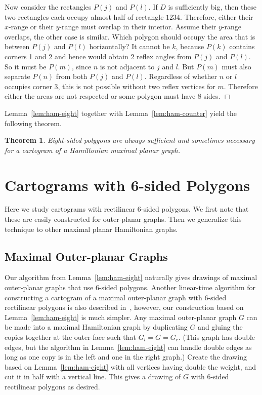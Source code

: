 \documentclass[11pt]{article}
\newtheorem{theorem}{Theorem}[section]
\newenvironment{proof}{{\bf Proof:} }{\hspace*{\fill}$\Box$\vspace{2mm}}
\begin{document}
\begin{proof}
Now consider the rectangles $P(j)$ and $P(l)$.  If $D$ is sufficiently big,
then these two rectangles each occupy almost half of rectangle $1234$.
Therefore, either their $x$-range or their $y$-range must overlap in their
interior.
Assume their $y$-range overlaps, the other case is similar.  Which polygon
should occupy the area that is between $P(j)$ and $P(l)$ horizontally?
It cannot be $k$, because $P(k)$ contains corners 1 and 2 and hence would
obtain 2 reflex angles from $P(j)$ and $P(l)$.  So it must be $P(m)$, since
$n$ is not adjacent to $j$ and $l$.
But $P(m)$ must
also separate $P(n)$ from both $P(j)$ and $P(l)$.  Regardless of whether
$n$ or $l$ occupies corner 3, this is not possible without two reflex
vertices for $m$.
Therefore either the areas are not respected or some polygon must have
8 sides.
\end{proof}

Lemma~\ref{lem:ham-eight} together with Lemma~\ref{lem:ham-counter} yield the
following theorem.

\begin{theorem}
 Eight-sided polygons are always sufficient and sometimes necessary for a cartogram of a Hamiltonian maximal planar graph.
\end{theorem}















\section{Cartograms with 6-sided Polygons}
\label{sec:six-side}


Here we study cartograms with
rectilinear 6-sided polygons. We first note that these are
easily constructed for outer-planar graphs.  Then we generalize this
technique to other maximal planar Hamiltonian graphs.

\subsection{Maximal Outer-planar Graphs}

Our algorithm from Lemma~\ref{lem:ham-eight} naturally gives drawings
of maximal outer-planar graphs that use 6-sided polygons.
Another linear-time algorithm for constructing a cartogram of a maximal
outer-planar graph with 6-sided rectilinear polygons is also described
in~\cite{ABFGKK11}, however, our construction
based on Lemma~\ref{lem:ham-eight} is much simpler.
Any
maximal outer-planar graph $G$ can be made into a maximal Hamiltonian
graph by duplicating $G$ and gluing the copies together at the outer-face
such that $G_l=G=G_r$.  (This graph has double edges, but the algorithm
in Lemma~\ref{lem:ham-eight} can handle double edges as long as one
copy is in the left and one in the right graph.)  Create the drawing
based on Lemma~\ref{lem:ham-eight} with all vertices having double the weight,
and cut it in half with a vertical line.  This gives a drawing of $G$
with 6-sided rectilinear polygons as desired.
\end{document}
